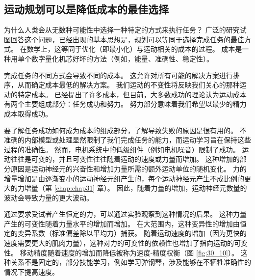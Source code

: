 \subsection{运动规划可以是降低成本的最佳选择}
为什么人类会从无数种可能性中选择一种特定的方式来执行任务？ 广泛的研究试图回答这个问题，已经出现的基本思想是，规划可以等同于选择完成任务的最佳方式。 在数学上，这等同于优化（即最小化）与运动相关的成本的过程。 成本是一种用单个数字量化机芯好坏的方法（例如，能量、准确性、稳定性）。

完成任务的不同方式会导致不同的成本。 这允许对所有可能的解决方案进行排序，从而确定成本最低的解决方案。 我们运动的不变性将反映我们关心的那种运动的特定成本。 已经提出了许多成本，但目前，大多数成功的理论认为运动成本有两个主要组成部分：任务成功和努力。 努力部分意味着我们希望以最少的精力成本取得成功。

要了解任务成功如何成为成本的组成部分，了解导致失败的原因是很有用的。 不准确的内部模型或处理显然限制了我们完成任务的能力，而运动学习旨在保持这些过程的准确性。 然而，电机系统中的低级组件（例如电机噪音）限制了成功。 运动往往是可变的，并且可变性往往随着运动的速度或力量而增加。 这种增加的部分原因是运动神经元的兴奋性和增加力量所需的额外运动单位的随机变化。 力的增量增加是由逐渐变小的运动神经元组产生的，每个运动神经元产生不成比例的更大的力增量（第 \ref{chap:chap31} 章）。 因此，随着力量的增加，运动神经元数量的波动会导致力量的更大波动。


通过要求受试者产生恒定的力，可以通过实验观察到这种情况的后果。 这种力量产生的可变性随着力量水平的增加而增加。 在大范围内，这种变异性的增加由恒定的变异系数（标准偏差除以平均力）捕获。 
随着运动速度的增加（因为更快的速度需要更大的肌肉力量），这种对力的可变性的依赖性也增加了指向运动的可变性。 移动精度随着速度的增加而降低被称为速度-精度权衡（图 \ref{fig:30_10}）。 
这种关系不是固定的，部分技能学习，例如学习弹钢琴，涉及能够在不牺牲准确性的情况下提高速度。

